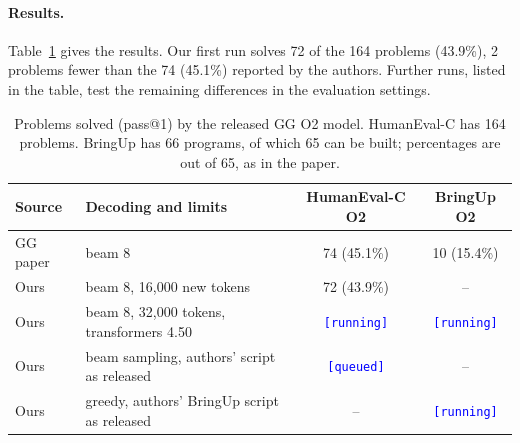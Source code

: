 \documentclass{article}
\newcommand{\placeholder}[1]{\texttt{\textcolor{blue}{[#1]}}}
\begin{document}
\paragraph{Results.}
Table~\ref{tab:baseline} gives the results. Our first run solves 72 of the 164 problems (43.9\%), 2 problems fewer than the 74 (45.1\%) reported by the authors. Further runs, listed in the table, test the remaining differences in the evaluation settings.

\begin{table}[h]
\centering
\caption{Problems solved (pass@1) by the released GG O2 model. HumanEval-C has 164 problems. BringUp has 66 programs, of which 65 can be built; percentages are out of 65, as in the paper.}
\label{tab:baseline}
\small
\begin{tabular}{@{}llcc@{}}
\toprule
Source & Decoding and limits & HumanEval-C O2 & BringUp O2 \\
\midrule
GG paper \citep{gg} & beam 8 & 74 (45.1\%) & 10 (15.4\%) \\
Ours & beam 8, 16{,}000 new tokens & 72 (43.9\%) & -- \\
Ours & beam 8, 32{,}000 tokens, transformers 4.50 & \placeholder{running} & \placeholder{running} \\
Ours & beam sampling, authors' script as released & \placeholder{queued} & -- \\
Ours & greedy, authors' BringUp script as released & -- & \placeholder{running} \\
\bottomrule
\end{tabular}
\end{table}
\end{document}
